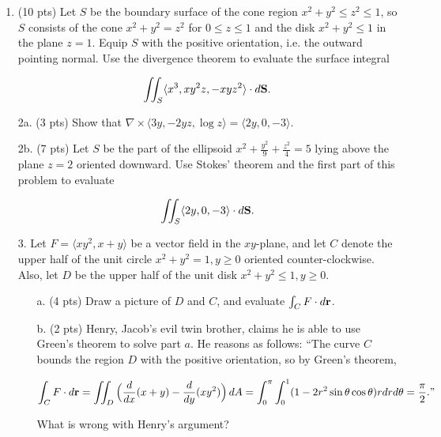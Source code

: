 \documentclass[12 pt]{report}
\begin{document}
\newpage
\begin{enumerate}

\item (10 pts) Let $S$ be the boundary surface of the cone region $x^2+y^2 \leq z^2 \leq 1$, so $S$ consists of the cone $x^2+y^2 = z^2$ for $0 \leq z \leq 1$ and the disk $x^2+y^2 \leq 1$ in the plane $z=1$. Equip $S$ with the positive orientation, i.e. the outward pointing normal. Use the divergence theorem to evaluate the surface integral

$$\iint_S \langle x^3, xy^2z, -xyz^2 \rangle \cdot d \bold{S}.$$
\newpage

\item[2a.] (3 pts) Show that $\nabla \times \langle 3y, -2yz, \log z \rangle = \langle 2y, 0, -3 \rangle$.

\vspace{5cm} 

\item[2b.] (7 pts) Let $S$ be the part of the ellipsoid $x^2+\frac{y^2}{9}+\frac{z^2}{4} = 5$ lying above the plane $z = 2$ oriented downward. Use Stokes' theorem and the first part of this problem to evaluate 

$$\iint_S \langle 2y, 0, -3 \rangle \cdot d\bold{S}.$$
 
\newpage

\item[3.] Let $F = \langle xy^2, x+y \rangle$ be a vector field in the $xy$-plane, and let $C$ denote the upper half of the unit circle $x^2+y^2 = 1, y \geq 0$ oriented counter-clockwise. Also, let $D$ be the upper half of the unit disk $x^2 + y^2 \leq 1, y \geq 0$. 
\begin{enumerate}
\item[a.] (4 pts) Draw a picture of $D$ and $C$, and evaluate $\int_C F \cdot d\bold{r}$. 

\vspace{7cm}

\item[b.] (2 pts) Henry, Jacob's evil twin brother, claims he is able to use Green's theorem to solve part $a$. He reasons as follows: ``The curve $C$ bounds the region $D$ with the positive orientation, so by Green's theorem, 

$$\int_C F \cdot d\bold{r} = \iint_D \Big(\frac{d}{dx}(x+y) - \frac{d}{dy}(xy^2) \Big) \, dA = \int_0^\pi \int_0^1 (1-2 r^2 \sin\theta \cos\theta) r dr d\theta = \frac{\pi}{2}."$$

What is wrong with Henry's argument?   


\end{enumerate}
\end{enumerate}
\end{document}
